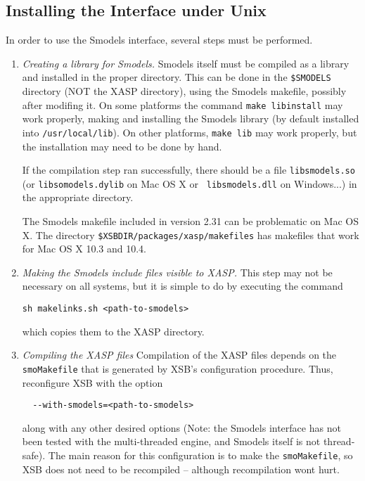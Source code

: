 \subsection{Installing the Interface under Unix}

In order to use the Smodels interface, several steps must be
performed.  

\begin{enumerate}
\item {\em Creating a library for Smodels.} Smodels itself must be
  compiled as a library and installed in the proper directory.  This
  can be done in the {\tt \$SMODELS} directory (NOT the XASP
  directory), using the Smodels makefile, possibly after modifing it.
  On some platforms the command {\tt make libinstall} may work
  properly, making and installing the Smodels library (by default
  installed into {\tt /usr/local/lib}).  On other platforms, {\tt make
    lib} may work properly, but the installation may need to be done
  by hand.

  If the compilation step ran successfully, there should be a file
  {\tt libsmodels.so} (or {\tt libsomodels.dylib} on Mac OS X or {\tt
    libsmodels.dll} on Windows...) in the appropriate directory.

  The Smodels makefile included in version 2.31 can be problematic on
  Mac OS X.  The directory {\tt \$XSBDIR/packages/xasp/makefiles} has
  makefiles that work for Mac OS X 10.3 and 10.4.

\item {\em Making the Smodels include files visible to XASP.}  This
  step may not be necessary on all systems, but it is simple to do by
  executing the command
%
\begin{verbatim}
sh makelinks.sh <path-to-smodels>
\end{verbatim}
%
which copies them to the XASP directory.

\item {\em Compiling the XASP files} Compilation of the XASP files
  depends on the {\tt smoMakefile} that is generated by XSB's
  configuration procedure.  Thus, reconfigure XSB with the option
\begin{verbatim}
  --with-smodels=<path-to-smodels> 
\end{verbatim}
  along with any other desired options (Note: the Smodels interface
  has not been tested with the multi-threaded engine, and Smodels
  itself is not thread-safe).  The main reason for this configuration
  is to make the {\tt smoMakefile}, so XSB does not need to be
  recompiled -- although recompilation wont hurt.


\end{enumerate}
